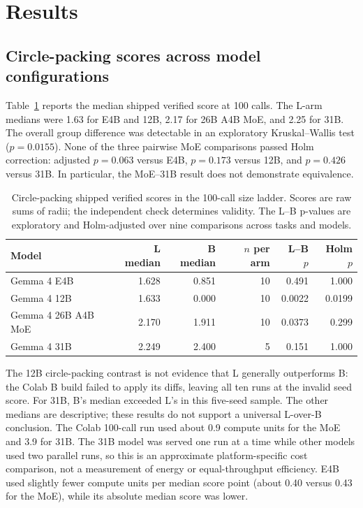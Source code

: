 \documentclass[11pt]{article}
\begin{document}
\section{Results}\label{sec:results}

\subsection{Circle-packing scores across model configurations}

Table~\ref{tab:scale} reports the median shipped verified score at 100 calls. The L-arm medians were 1.63 for E4B and 12B, 2.17 for 26B A4B MoE, and 2.25 for 31B. The overall group difference was detectable in an exploratory Kruskal--Wallis test ($p=0.0155$). None of the three pairwise MoE comparisons passed Holm correction: adjusted $p=0.063$ versus E4B, $p=0.173$ versus 12B, and $p=0.426$ versus 31B. In particular, the MoE--31B result does not demonstrate equivalence.

\begin{table}[tb]
\centering\small
\caption{Circle-packing shipped verified scores in the 100-call size ladder. Scores are raw sums of radii; the independent check determines validity. The L--B p-values are exploratory and Holm-adjusted over nine comparisons across tasks and models.}
\label{tab:scale}
\begin{tabularx}{\linewidth}{@{}lrrrrr@{}}
\toprule
Model & L median & B median & $n$ per arm & L--B $p$ & Holm $p$ \\
\midrule
Gemma 4 E4B & 1.628 & 0.851 & 10 & 0.491 & 1.000 \\
Gemma 4 12B & 1.633 & 0.000 & 10 & 0.0022 & 0.0199 \\
Gemma 4 26B A4B MoE & 2.170 & 1.911 & 10 & 0.0373 & 0.299 \\
Gemma 4 31B & 2.249 & 2.400 & 5 & 0.151 & 1.000 \\
\bottomrule
\end{tabularx}
\end{table}

The 12B circle-packing contrast is not evidence that L generally outperforms B: the Colab B build failed to apply its diffs, leaving all ten runs at the invalid seed score. For 31B, B's median exceeded L's in this five-seed sample. The other medians are descriptive; these results do not support a universal L-over-B conclusion. The Colab 100-call run used about 0.9 compute units for the MoE and 3.9 for 31B. The 31B model was served one run at a time while other models used two parallel runs, so this is an approximate platform-specific cost comparison, not a measurement of energy or equal-throughput efficiency. E4B used slightly fewer compute units per median score point (about 0.40 versus 0.43 for the MoE), while its absolute median score was lower.
\end{document}
